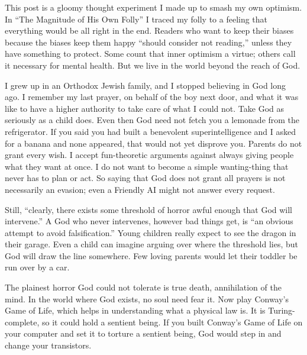
This post is a gloomy thought experiment I made up to smash my own optimism. In ``The Magnitude of His Own Folly'' I traced my folly to a feeling that everything would be all right in the end. Readers who want to keep their biases because the biases keep them happy ``should consider not reading,'' unless they have something to protect. Some count that inner optimism a virtue; others call it necessary for mental health. But we live in the world beyond the reach of God.

I grew up in an Orthodox Jewish family, and I stopped believing in God long ago. I remember my last prayer, on behalf of the boy next door, and what it was like to have a higher authority to take care of what I could not. Take God as seriously as a child does. Even then God need not fetch you a lemonade from the refrigerator. If you said you had built a benevolent superintelligence and I asked for a banana and none appeared, that would not yet disprove you. Parents do not grant every wish. I accept fun-theoretic arguments against always giving people what they want at once. I do not want to become a simple wanting-thing that never has to plan or act. So saying that God does not grant all prayers is not necessarily an evasion; even a Friendly AI might not answer every request.

Still, ``clearly, there exists some threshold of horror awful enough that God will intervene.'' A God who never intervenes, however bad things get, is ``an obvious attempt to avoid falsification.'' Young children really expect to see the dragon in their garage. Even a child can imagine arguing over where the threshold lies, but God will draw the line somewhere. Few loving parents would let their toddler be run over by a car. 

The plainest horror God could not tolerate is true death, annihilation of the mind. In the world where God exists, no soul need fear it. Now play Conway's Game of Life, which helps in understanding what a physical law is. It is Turing-complete, so it could hold a sentient being. If you built Conway's Game of Life on your computer and set it to torture a sentient being, God would step in and change your transistors. 

